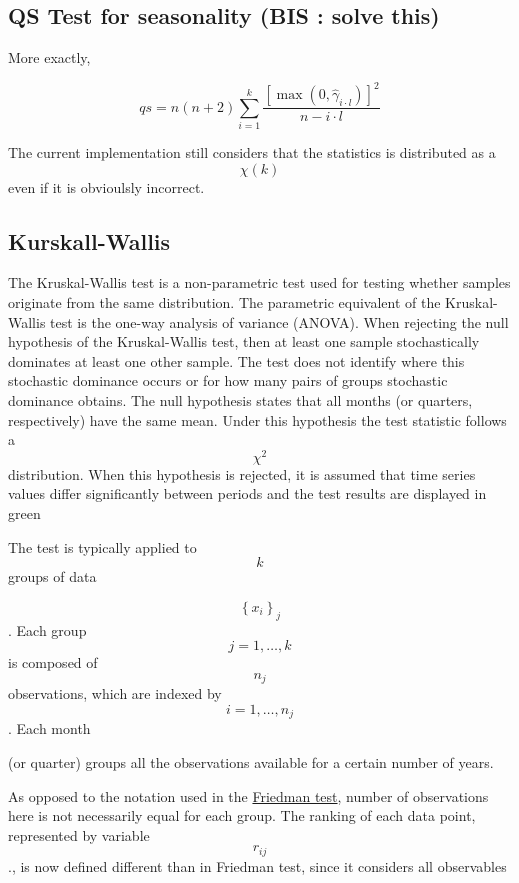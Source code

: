 \documentclass[
  letterpaper,
  DIV=11,
  numbers=noendperiod]{scrreprt}
\begin{document}
\hypertarget{qs-test-for-seasonality-bis-solve-this}{%
\subsection{QS Test for seasonality (BIS : solve
this)}\label{qs-test-for-seasonality-bis-solve-this}}

More exactly,

\[ qs=n \left(n+2\right)\sum_{i=1}^k\frac{\left[ \max  \left(0, \hat\gamma_{i \cdot l}\right)\right]^2}{n-i \cdot l}\]

The current implementation still considers that the statistics is
distributed as a \[\chi \left(k\right)\] even if it is obvioulsly
incorrect.

\hypertarget{kurskall-wallis}{%
\subsection{Kurskall-Wallis}\label{kurskall-wallis}}

The Kruskal-Wallis test is a non-parametric test used for testing
whether samples originate from the same distribution. The parametric
equivalent of the Kruskal-Wallis test is the one-way analysis of
variance (ANOVA). When rejecting the null hypothesis of the
Kruskal-Wallis test, then at least one sample stochastically dominates
at least one other sample. The test does not identify where this
stochastic dominance occurs or for how many pairs of groups stochastic
dominance obtains. The null hypothesis states that all months (or
quarters, respectively) have the same mean. Under this hypothesis the
test statistic follows a \[ \chi^2 \] distribution. When this hypothesis
is rejected, it is assumed that time series values differ significantly
between periods and the test results are displayed in green

The test is typically applied to \[ k  \] groups of data

\[ \left\{x_{i}\right\}_{j} \]. Each group \[ j=1,…,k \] is composed of
\[ n_j \] observations, which are indexed by \[ i=1,…,n_j \]. Each month

(or quarter) groups all the observations available for a certain number
of years.

As opposed to the notation used in the
\href{../theory/Tests_Friedman.html}{Friedman test}, number of
observations here is not necessarily equal for each group. The ranking
of each data point, represented by variable \[ r_{ij} \]., is now
defined different than in Friedman test, since it considers all
observables
\end{document}
